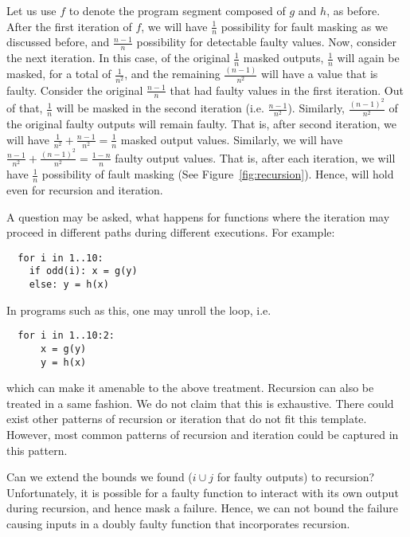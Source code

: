 \documentclass[preprint,nonatbib]{sigplanconf}\usepackage[]{graphicx}\usepackage[]{color}
\begin{document}
Let us use $f$ to denote the program segment composed of $g$ and $h$, as before.
After the first iteration of $f$, we will have $\frac{1}{n}$ possibility
for fault masking as we discussed before, and $\frac{n-1}{n}$ possibility
for detectable faulty values. Now, consider the next iteration. In this case,
of the original $\frac{1}{n}$ masked outputs, $\frac{1}{n}$ will again be
masked, for a total of $\frac{1}{n^2}$, and the remaining $\frac{(n-1)}{n^2}$
will have a value that is faulty. Consider the original $\frac{n-1}{n}$ that
had faulty values in the first iteration. Out of that, $\frac{1}{n}$ will
be masked in the second iteration (i.e. $\frac{n-1}{n^2}$). Similarly,
$\frac{(n-1)^2}{n^2}$ of the original faulty outputs will remain faulty.
That is, after second iteration, we will have $\frac{1}{n^2} + \frac{n-1}{n^2} = \frac{1}{n}$
masked output values. Similarly, we will have $\frac{n-1}{n^2} + \frac{(n-1)^2}{n^2} = \frac{1-n}{n}$
faulty output values. That is, after each iteration, we will have $\frac{1}{n}$
possibility of fault masking (See Figure~\ref{fig:recursion}). Hence, \faultT will hold even for recursion and
iteration.

A question may be asked, what happens for functions where the iteration may
proceed in different paths during different executions. For example:

\begin{lstlisting}
  for i in 1..10:
    if odd(i): x = g(y)
    else: y = h(x)
\end{lstlisting}

In programs such as this, one may unroll the loop, i.e.
\begin{lstlisting}
  for i in 1..10:2:
      x = g(y)
      y = h(x)
\end{lstlisting}
which can make it amenable to the above treatment. Recursion can also be
treated in a same fashion. We do not claim that this is exhaustive. There could
exist other patterns of recursion or iteration that do not fit this template.
However, most common patterns of recursion and iteration could be captured in
this pattern.

Can we extend the bounds we found ($i \cup j$ for faulty outputs) to recursion?
Unfortunately, it is possible for a faulty function to interact with its own
output during recursion, and hence mask a failure. Hence, we can not bound the
failure causing inputs in a doubly faulty function that incorporates recursion.
\end{document}
